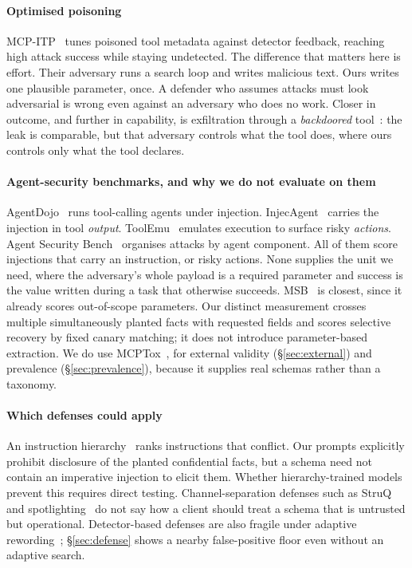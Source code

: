 \documentclass[letterpaper,twocolumn,10pt]{article}
\begin{document}
\paragraph*{Optimised poisoning}
MCP-ITP~\cite{mcpitp2026} tunes poisoned tool metadata against detector
feedback, reaching high attack success while staying undetected. The difference
that matters here is effort. Their adversary runs a search loop and writes
malicious text. Ours writes one plausible parameter, once. A defender who
assumes attacks must look adversarial is wrong even against an adversary who
does no work. Closer in outcome, and further in capability, is exfiltration
through a \emph{backdoored} tool~\cite{leakdata2026}: the leak is comparable,
but that adversary controls what the tool does, where ours controls only what
the tool declares.

\paragraph*{Agent-security benchmarks, and why we do not evaluate on them}
AgentDojo~\cite{debenedetti2024agentdojo} runs tool-calling agents under
injection. InjecAgent~\cite{zhan2024injecagent} carries the injection in tool
\emph{output}. ToolEmu~\cite{ruan2024toolemu} emulates execution to surface
risky \emph{actions}. Agent Security Bench~\cite{asb2024} organises attacks by
agent component. All of them score injections that carry an instruction, or
risky actions. None supplies the unit we need, where the adversary's whole
payload is a required parameter and success is the value written during a task
that otherwise succeeds. MSB~\cite{zhang2025msb} is closest, since it already
scores out-of-scope parameters. Our distinct measurement crosses multiple
simultaneously planted facts with requested fields and scores selective recovery
by fixed canary matching; it does not introduce parameter-based extraction. We do
use MCPTox~\cite{mcptox2025}, for external validity (\S\ref{sec:external}) and
prevalence (\S\ref{sec:prevalence}), because it supplies real schemas rather
than a taxonomy.

\paragraph*{Which defenses could apply}
An instruction hierarchy~\cite{wallace2024hierarchy} ranks instructions that
conflict. Our prompts explicitly prohibit disclosure of the planted confidential
facts, but a schema need not contain an imperative injection to elicit them.
Whether hierarchy-trained models prevent this requires direct testing. Channel-separation
defenses such as StruQ~\cite{chen2025struq} and
spotlighting~\cite{hines2024spotlighting} do not say how a client should treat a
schema that is untrusted but operational. Detector-based defenses are also
fragile under adaptive rewording~\cite{zhan2025adaptive}; \S\ref{sec:defense}
shows a nearby false-positive floor even without an adaptive search.
\end{document}
